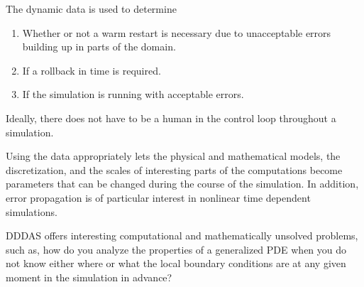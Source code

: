 \documentclass{report}
\begin{document}
The dynamic data is used to determine
\begin{enumerate}
\item Whether or not a warm restart is necessary due to
unacceptable errors building up in parts of the domain.
\item If a rollback in time is required.
\item If the simulation is running with acceptable errors.
\end{enumerate}

Ideally, there does not have to be a human in the
control loop throughout a simulation.

Using the data appropriately lets the physical and
mathematical models, the discretization, and the
scales of interesting parts of the computations
become parameters that can be changed during the
course of the simulation. In addition, error
propagation is of particular interest in nonlinear
time dependent simulations.

DDDAS offers interesting computational and
mathematically unsolved problems, such as, how do you
analyze the properties of a generalized PDE when you
do not know either where or what the local boundary
conditions are at any given moment in the simulation
in advance?
\end{document}
